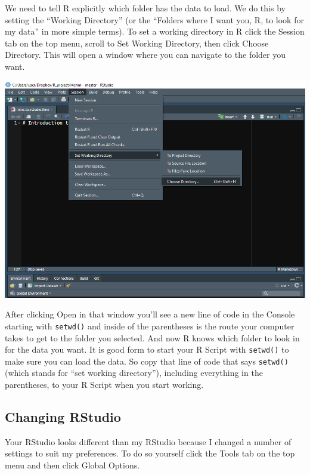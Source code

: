 \documentclass[
  12pt,
]{book}
\begin{document}
We need to tell R explicitly which folder has the data to load. We do this by setting the ``Working Directory'' (or the ``Folders where I want you, R, to look for my data'' in more simple terms). To set a working directory in R click the Session tab on the top menu, scroll to Set Working Directory, then click Choose Directory. This will open a window where you can navigate to the folder you want.

\includegraphics{images/rstudio_3.PNG}

After clicking Open in that window you'll see a new line of code in the Console starting with \texttt{setwd()} and inside of the parentheses is the route your computer takes to get to the folder you selected. And now R knows which folder to look in for the data you want. It is good form to start your R Script with \texttt{setwd()} to make sure you can load the data. So copy that line of code that says \texttt{setwd()} (which stands for ``set working directory''), including everything in the parentheses, to your R Script when you start working.

\hypertarget{changing-rstudio}{%
\subsection{Changing RStudio}\label{changing-rstudio}}

Your RStudio looks different than my RStudio because I changed a number of settings to suit my preferences. To do so yourself click the Tools tab on the top menu and then click Global Options.
\end{document}
